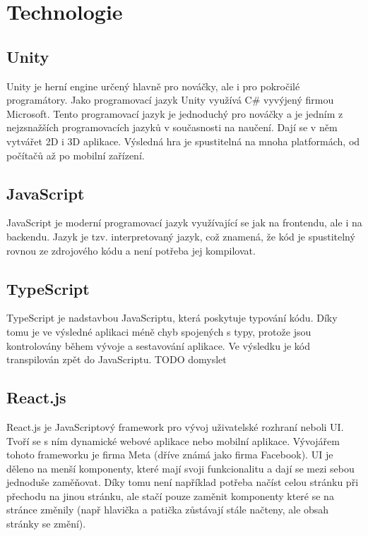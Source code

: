\section{Technologie}

\subsection{Unity}
Unity je herní engine určený hlavně pro nováčky, ale i pro pokročilé programátory. Jako programovací jazyk Unity využívá C\# vyvýjený firmou Microsoft. Tento programovací jazyk je jednoduchý pro nováčky a je jedním z nejzsnažších programovacích jazyků v současnosti na naučení. \cite{Csharp} Dají se v něm vytvářet 2D i 3D aplikace. Výsledná hra je spustitelná na mnoha platformách, od počítačů až po mobilní zařízení.

\subsection{JavaScript}
JavaScript je moderní programovací jazyk využívající se jak na frontendu, ale i na backendu. Jazyk je tzv. interpretovaný jazyk, což znamená, že kód je spustitelný rovnou ze zdrojového kódu a není potřeba jej kompilovat.

\subsection{TypeScript}
TypeScript je nadstavbou JavaScriptu, která poskytuje typování kódu. Díky tomu je ve výsledné aplikaci méně chyb spojených s typy, protože jsou kontrolovány během vývoje a sestavování aplikace. Ve výsledku je kód transpilován zpět do JavaScriptu.
TODO domyslet

\subsection{React.js}
React.js je JavaScriptový framework pro vývoj uživatelské rozhraní neboli UI. Tvoří se s ním dynamické webové aplikace nebo mobilní aplikace. Vývojářem tohoto frameworku je firma Meta (dříve známá jako firma Facebook). UI je děleno na menší komponenty, které mají svoji funkcionalitu a dají se mezi sebou jednoduše zaměňovat. Díky tomu není například potřeba načíst celou stránku při přechodu na jinou stránku, ale stačí pouze zaměnit komponenty které se na stránce změnily (např hlavička a patička zůstávají stále načteny, ale obsah stránky se změní).

